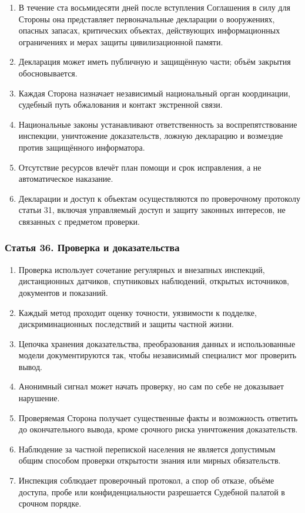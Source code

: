 \documentclass[
  russian,
  11pt,
  a4paper,
]{article}
\providecommand{\tightlist}{%
  \setlength{\itemsep}{0pt}\setlength{\parskip}{0pt}}
\begin{document}
\begin{enumerate}
\def\labelenumi{\arabic{enumi}.}
\tightlist
\item
  В течение ста восьмидесяти дней после вступления Соглашения в силу для
  Стороны она представляет первоначальные декларации о вооружениях,
  опасных запасах, критических объектах, действующих информационных
  ограничениях и мерах защиты цивилизационной памяти.
\item
  Декларация может иметь публичную и защищённую части; объём закрытия
  обосновывается.
\item
  Каждая Сторона назначает независимый национальный орган координации,
  судебный путь обжалования и контакт экстренной связи.
\item
  Национальные законы устанавливают ответственность за
  воспрепятствование инспекции, уничтожение доказательств, ложную
  декларацию и возмездие против защищённого информатора.
\item
  Отсутствие ресурсов влечёт план помощи и срок исправления, а не
  автоматическое наказание.
\item
  Декларации и доступ к объектам осуществляются по проверочному
  протоколу статьи 31, включая управляемый доступ и защиту законных
  интересов, не связанных с предметом проверки.
\end{enumerate}

\subsubsection{Статья 36. Проверка и
доказательства}\label{ux441ux442ux430ux442ux44cux44f-36-ux43fux440ux43eux432ux435ux440ux43aux430-ux438-ux434ux43eux43aux430ux437ux430ux442ux435ux43bux44cux441ux442ux432ux430}

\begin{enumerate}
\def\labelenumi{\arabic{enumi}.}
\tightlist
\item
  Проверка использует сочетание регулярных и внезапных инспекций,
  дистанционных датчиков, спутниковых наблюдений, открытых источников,
  документов и показаний.
\item
  Каждый метод проходит оценку точности, уязвимости к подделке,
  дискриминационных последствий и защиты частной жизни.
\item
  Цепочка хранения доказательства, преобразования данных и
  использованные модели документируются так, чтобы независимый
  специалист мог проверить вывод.
\item
  Анонимный сигнал может начать проверку, но сам по себе не доказывает
  нарушение.
\item
  Проверяемая Сторона получает существенные факты и возможность ответить
  до окончательного вывода, кроме срочного риска уничтожения
  доказательств.
\item
  Наблюдение за частной перепиской населения не является допустимым
  общим способом проверки открытости знания или мирных обязательств.
\item
  Инспекция соблюдает проверочный протокол, а спор об отказе, объёме
  доступа, пробе или конфиденциальности разрешается Судебной палатой в
  срочном порядке.
\end{enumerate}
\end{document}
